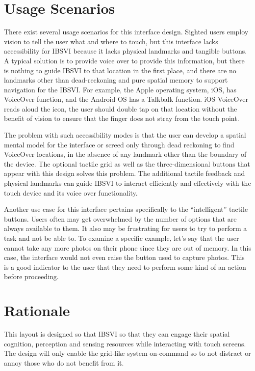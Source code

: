 \documentclass[11pt]{article}
\begin{document}
\section{Usage Scenarios}
There exist several usage scenarios for this interface design. Sighted users employ vision to tell the user what and where to touch, but this interface lacks accessibility for IBSVI because it lacks physical landmarks and tangible buttons. A typical solution is to provide voice over to provide this information, but there is nothing to guide IBSVI to that location in the first place, and there are no landmarks other than dead-reckoning and pure spatial memory to support navigation for the IBSVI. For example, the Apple operating system, iOS, has VoiceOver function, and the Android OS has a Talkbalk function. iOS VoiceOver reads aloud the icon, the user should double tap on that location without the benefit of vision to ensure that the finger does not stray from the touch point. 

The problem with such accessibility modes is that the user can develop a spatial mental model for the interface or screed only through dead reckoning to find VoiceOver locations, in the absence of any landmark other than the boundary of the device. The optional tactile grid as well as the three-dimensional buttons that appear with this design solves this problem. The additional tactile feedback and physical landmarks can guide IBSVI to interact efficiently and effectively with the touch device and its voice over functionality.

Another use case for this interface pertains specifically to the ``intelligent'' tactile buttons. Users often may get overwhelmed by the number of options that are always available to them. It also may be frustrating for users to try to perform a task and not be able to. To examine a specific example, let's say that the user cannot take any more photos on their phone since they are out of memory. In this case, the interface would not even raise the button used to capture photos. This is a good indicator to the user that they need to perform some kind of an action before proceeding.

\section{Rationale}
This layout is designed so that IBSVI so that they can engage their spatial cognition, perception and sensing resources while interacting with touch screens. The design will only enable the grid-like system on-command so to not distract or annoy those who do not benefit from it.
\end{document}
